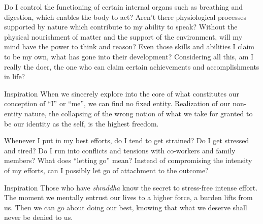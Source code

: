 
\newpage
\begin{mananam}{} 
\mananamtext Do I control the functioning of certain internal organs such as breathing and digestion, which enables the body to act? Aren’t there physiological processes supported by nature which contribute to my ability to speak? Without the physical nourishment of matter and the support of the environment, will my mind have the power to think and reason? Even those skills and abilities I claim to be my own, what has gone into their development? Considering all this, am I really the doer, the one who can claim certain achievements and accomplishments in life?
\end{mananam}
\WritingHand{}
\begin{inspiration}{\mananamfont Inspiration}
\mananamtext When we sincerely explore into the core of what constitutes our conception of “I” or “me”, we can find no fixed entity. Realization of our non-entity nature, the collapsing of the wrong notion of what we take for granted to be our identity as the self, is the highest freedom.
\end{inspiration}
\newpage

\newpage
\begin{mananam}{} 
\mananamtext Whenever I put in my best efforts, do I tend to get strained? Do I get stressed and tired? Do I run into conflicts and tensions with co-workers and family members? What does “letting go” mean? Instead of compromising the intensity of my efforts, can I possibly let go of attachment to the outcome? 
\end{mananam}
\WritingHand{}
\begin{inspiration}{\mananamfont Inspiration}
\mananamtext Those who have \emph{shraddha} know the secret to stress-free intense effort. The moment we mentally entrust our lives to a higher force, a burden lifts from us. Then we can go about doing our best, knowing that what we deserve shall never be denied to us.
\end{inspiration}
\newpage


